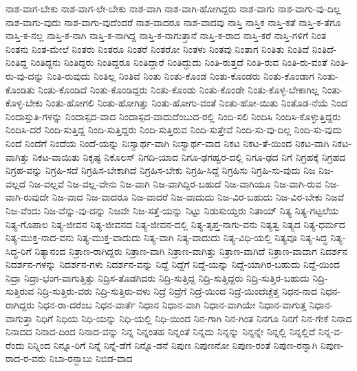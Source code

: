 {ನಾಶ-ವಾಗ-ಬೇಕು
ನಾಶ-ವಾಗ-ಲೇ-ಬೇಕು
ನಾಶ-ವಾಗಿ
ನಾಶ-ವಾಗಿ-ಹೋಗಿದ್ದರು
ನಾಶ-ವಾಗು
ನಾಶ-ವಾಗು-ವು-ದಿಲ್ಲ
ನಾಶ-ವಾಗು-ವುದು
ನಾಶ-ವಾಗು-ವುದೆಂದರೆ
ನಾಶ-ವಾದರೂ
ನಾಶ-ವಾದವು
ನಾಸ್ತಿ
ನಾಸ್ತಿಕ
ನಾಸ್ತಿ-ಕತೆ
ನಾಸ್ತಿ-ಕ-ತೆಗೂ
ನಾಸ್ತಿ-ಕ-ನಲ್ಲ
ನಾಸ್ತಿ-ಕ-ನಾಗಿ
ನಾಸ್ತಿ-ಕ-ನಾಗಿದ್ದ
ನಾಸ್ತಿ-ಕ-ನಾಗುತ್ತಾನೆ
ನಾಸ್ತಿ-ಕ-ರಾದ
ನಾಸ್ತಿ-ಕರೆ
ನಾಸ್ತಿ-ಗಳಿಗೆ
ನಿಂತ
ನಿಂತನು
ನಿಂತ-ಮೇಲೆ
ನಿಂತರು
ನಿಂತರೂ
ನಿಂತರೆ
ನಿಂತರೋ
ನಿಂತಳು
ನಿಂತವು
ನಿಂತಾಗ
ನಿಂತಿತು
ನಿಂತಿದೆ
ನಿಂತಿದೆ-
ನಿಂತಿದ್ದ
ನಿಂತಿದ್ದನು
ನಿಂತಿದ್ದರು
ನಿಂತಿದ್ದರೂ
ನಿಂತಿದ್ದಾರೆ
ನಿಂತಿದ್ದುದು
ನಿಂತಿ-ರುತ್ತದೆ
ನಿಂತಿ-ರುವ
ನಿಂತಿ-ರು-ವಂತೆ
ನಿಂತಿ-ರು-ವು-ದನ್ನು
ನಿಂತಿ-ರುವುದು
ನಿಂತಿಲ್ಲ
ನಿಂತಿವೆ
ನಿಂತು
ನಿಂತು-ಕೊಂಡ
ನಿಂತು-ಕೊಂಡರು
ನಿಂತು-ಕೊಂಡಾಗ
ನಿಂತು-ಕೊಂಡಿತು
ನಿಂತು-ಕೊಂಡಿದೆ
ನಿಂತು-ಕೊಂಡಿದ್ದರು
ನಿಂತು-ಕೊಂಡು
ನಿಂತು-ಕೊಂಡೇ
ನಿಂತು-ಕೊಳ್ಳ-ಬೇಕಾಗಿಲ್ಲ
ನಿಂತು-ಕೊಳ್ಳ-ಬೇಕು
ನಿಂತು-ಹೋಗಲಿ
ನಿಂತು-ಹೋಗಿತ್ತು
ನಿಂತು-ಹೋಗು-ವಂತೆ
ನಿಂತು-ಹೋ-ಯಿತು
ನಿಂತೊಡ-ನೆಯೆ
ನಿಂದ
ನಿಂದಾಸ್ತುತಿ-ಗಳನ್ನು
ನಿಂದಾಸ್ಪದ-ವಾದ
ನಿಂದಾಸ್ಪದ-ವಾದುದೆಂಬುದ-ರಲ್ಲಿ
ನಿಂದಿ-ಸಲಿ
ನಿಂದಿಸಿ
ನಿಂದಿಸಿ-ಕೊಳ್ಳುತ್ತಿದ್ದರು
ನಿಂದಿಸಿ-ದರೆ
ನಿಂದಿ-ಸುತ್ತಿದ್ದ
ನಿಂದಿ-ಸುತ್ತಿದ್ದರು
ನಿಂದಿ-ಸುತ್ತಿರುವ
ನಿಂದಿ-ಸುತ್ತೇವೆ
ನಿಂದಿ-ಸು-ವು-ದಿಲ್ಲ
ನಿಂದಿ-ಸು-ವುದು
ನಿಂದೆ
ನಿಂದೆಗೆ
ನಿಂದೆಯ
ನಿಂದೆ-ಯನ್ನು
ನಿಃಸ್ವಾರ್ಥ-ವಾಗಿ
ನಿಃಸ್ವಾರ್ಥ-ವಾದ
ನಿಕಟ
ನಿಕಟ-ತೆ-ಯಿಂದ
ನಿಕಟ-ವಾಗಿ
ನಿಕಟ-ವಾಗಿತ್ತು
ನಿಕಟ-ವಾಯಿತು
ನಿಕೃಷ್ಟ
ನಿಕೊಲಸ್
ನಿಗದಿ-ಯಾದ
ನಿಗೂ-ಢಗಹ್ವರ-ದಲ್ಲಿ
ನಿಗೂ-ಢದ
ನಿಗೆ
ನಿಗ್ರಹಕ್ಕೆ
ನಿಗ್ರಹದ
ನಿಗ್ರಹ-ವನ್ನು
ನಿಗ್ರಹಿ-ಸದೆ
ನಿಗ್ರಹಿಸ-ಬೇಕಾಗಿದೆ
ನಿಗ್ರಹಿಸ-ಬೇಕು
ನಿಗ್ರಹಿ-ಸಿದ್ದೆ
ನಿಗ್ರಹಿಸು
ನಿಗ್ರಹಿ-ಸು-ವುದು
ನಿಜ
ನಿಜ-ವಲ್ಲದೆ
ನಿಜ-ವಲ್ಲವೆ
ನಿಜ-ವಲ್ಲ-ವೇನು
ನಿಜ-ವಾಗಿ
ನಿಜ-ವಾಗಿದ್ದಿರ-ಬಹುದೆ
ನಿಜ-ವಾಗಿಯೂ
ನಿಜ-ವಾಗಿ-ರುವ
ನಿಜ-ವಾಗಿ-ರುವುದೇ
ನಿಜ-ವಾದ
ನಿಜ-ವಾದರೂ
ನಿಜ-ವಾದರೆ
ನಿಜ-ವಾದುದು
ನಿಜ-ವಿರ-ಬಹುದು
ನಿಜ-ವಿರ-ಬೇಕು
ನಿಜವೆ
ನಿಜ-ವೆಂದು
ನಿಜ-ವೆನ್ನು-ವು-ದನ್ನು
ನಿಜವೇ
ನಿಜ-ಸತ್ತೆ-ಯನ್ನು
ನಿಟ್ಟು
ನಿಡುಸುಯ್ದರು
ನಿತಾಯ್
ನಿತ್ಯ
ನಿತ್ಯ-ಗಟ್ಟಲೆಯ
ನಿತ್ಯ-ಗೊಪಾಲ
ನಿತ್ಯ-ಜೀವನ
ನಿತ್ಯ-ಜೀವನದ
ನಿತ್ಯ-ಜೀವನ-ದಲ್ಲಿ
ನಿತ್ಯ-ತೃಪ್ತ-ನಾಗು-ವನು
ನಿತ್ಯತ್ವ
ನಿತ್ಯದ
ನಿತ್ಯ-ಧರ್ಮದ
ನಿತ್ಯ-ಮುಕ್ತ-ನಾದ-ವನು
ನಿತ್ಯ-ಮುಕ್ತ-ವಾದುದು
ನಿತ್ಯ-ವಾಗಿ
ನಿತ್ಯ-ವಾದುದು
ನಿತ್ಯ-ವಿಧಿ-ಯಲ್ಲಿ
ನಿತ್ಯವೂ
ನಿತ್ಯ-ಸಿದ್ಧ
ನಿತ್ಯ-ಸಿದ್ಧ-ರಿಗೆ
ನಿತ್ಯಾನಂದ
ನಿತ್ರಾಣ-ರಾಗಿದ್ದರು
ನಿತ್ರಾಣ-ವಾಗಿ
ನಿತ್ರಾಣ-ವಾಗಿತ್ತು
ನಿತ್ರಾಣ-ವಾಗಿದೆ
ನಿತ್ರಾಣ-ವಾದಾಗ
ನಿದರ್ಶನ
ನಿದರ್ಶನ-ಗಳನ್ನು
ನಿದರ್ಶನ-ಗಳು
ನಿದರ್ಶನ-ವನ್ನು
ನಿದ್ದೆ
ನಿದ್ದೆಗೆ
ನಿದ್ದೆ-ಯನ್ನು
ನಿದ್ದೆ-ಯಾಗಿರ-ಬಹುದು
ನಿದ್ದೆ-ಯಿಂದ
ನಿದ್ರಾ
ನಿದ್ರಾ-ಭಂಗ-ವಾಗುತ್ತಿತ್ತು
ನಿದ್ರಿಸ-ತೊಡಗಿದರು
ನಿದ್ರಿ-ಸುತ್ತಿದ್ದ
ನಿದ್ರಿ-ಸುತ್ತಿದ್ದರು
ನಿದ್ರಿ-ಸುತ್ತಿರ-ಬಹುದು
ನಿದ್ರಿ-ಸುತ್ತಿರುವ
ನಿದ್ರಿ-ಸುತ್ತಿರು-ವರು
ನಿದ್ರಿ-ಸುತ್ತಿರು-ವಳು
ನಿದ್ರೆ
ನಿದ್ರೆಗೆ
ನಿದ್ರೆ-ಯಿಂದ
ನಿದ್ರೆ-ಯಿಂದೆಚ್ಚೆತ್ತ
ನಿಧನ-ನಾದ
ನಿಧನ-ರಾಗಿದ್ದರು
ನಿಧನ-ರಾ-ದರೆಂಬ
ನಿಧನ-ವಾರ್ತೆ
ನಿಧಾನ
ನಿಧಾನ-ವಾಗಿ
ನಿಧಾನ-ವಾಗಿಯೇ
ನಿಧಾನ-ವಾಗುತ್ತ
ನಿಧಾನ-ವಾಗುತ್ತಾ
ನಿಧಿಗೆ
ನಿಧಿಯ
ನಿಧಿ-ಯನ್ನು
ನಿಧಿ-ಯಲ್ಲಿ
ನಿಧಿ-ಯಿಂದ
ನಿನ-ಗಾಗಿ
ನಿನ-ಗಿಂತ
ನಿನಗೂ
ನಿನಗೆ
ನಿನ-ಗೇಕೆ
ನಿನಾದ
ನಿನಾದದ
ನಿನಾದ-ದಿಂದ
ನಿನಾದ-ವನ್ನು
ನಿನ್ನ
ನಿನ್ನಂತಹ
ನಿನ್ನಂತೆ
ನಿನ್ನದು
ನಿನ್ನನ್ನು
ನಿನ್ನನ್ನೇ
ನಿನ್ನಲ್ಲಿ
ನಿನ್ನಲ್ಲಿದೆ
ನಿನ್ನ-ವ-ರೆಂದು
ನಿನ್ನಿಂದ
ನಿನ್ನೂ-ರಿಗೆ
ನಿನ್ನೆ
ನಿನ್ನೆ-ಡೆಗೆ
ನಿನ್ನೊ-ಡನೆ
ನಿಪುಣ
ನಿಪುಣನೋ
ನಿಪುಣ-ರಂತೆ
ನಿಪುಣ-ರನ್ನಾಗಿ
ನಿಪುಣ-ರಾದ-ರ-ವರು
ನಿಬಾ-ರನ್ಬಾಬು
ನಿಬಿಡ-ವಾದ
}
